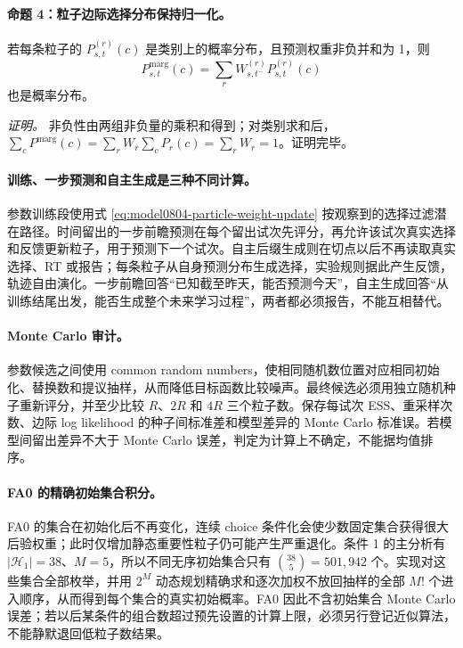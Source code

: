 \paragraph{命题 4：粒子边际选择分布保持归一化。}
若每条粒子的 $P^{(r)}_{s,t}(c)$ 是类别上的概率分布，且预测权重非负并和为 1，则
\begin{equation}
    P^{\mathrm{marg}}_{s,t}(c)
    =\sum_rW^{(r)}_{s,t^-}P^{(r)}_{s,t}(c)
    \label{eq:model0804-marginal-distribution}
\end{equation}
也是概率分布。

\textit{证明。}
非负性由两组非负量的乘积和得到；对类别求和后，$\sum_cP^{\mathrm{marg}}(c)=\sum_rW_r\sum_cP_r(c)=\sum_rW_r=1$。证明完毕。

\paragraph{训练、一步预测和自主生成是三种不同计算。}
参数训练段使用式 \ref{eq:model0804-particle-weight-update} 按观察到的选择过滤潜在路径。时间留出的一步前瞻预测在每个留出试次先评分，再允许该试次真实选择和反馈更新粒子，用于预测下一个试次。自主后缀生成则在切点以后不再读取真实选择、RT 或报告；每条粒子从自身预测分布生成选择，实验规则据此产生反馈，轨迹自由演化。一步前瞻回答“已知截至昨天，能否预测今天”，自主生成回答“从训练结尾出发，能否生成整个未来学习过程”，两者都必须报告，不能互相替代。

\paragraph{Monte Carlo 审计。}
参数候选之间使用 common random numbers，使相同随机数位置对应相同初始化、替换数和提议抽样，从而降低目标函数比较噪声。最终候选必须用独立随机种子重新评分，并至少比较 $R$、$2R$ 和 $4R$ 三个粒子数。保存每试次 ESS、重采样次数、边际 log likelihood 的种子间标准差和模型差异的 Monte Carlo 标准误。若模型间留出差异不大于 Monte Carlo 误差，判定为计算上不确定，不能据均值排序。

\paragraph{FA0 的精确初始集合积分。}
FA0 的集合在初始化后不再变化，连续 choice 条件化会使少数固定集合获得很大后验权重；此时仅增加静态重要性粒子仍可能产生严重退化。条件 1 的主分析有 $|\mathcal H_1|=38$、$M=5$，所以不同无序初始集合只有 $\binom{38}{5}=501{,}942$ 个。实现对这些集合全部枚举，并用 $2^M$ 动态规划精确求和逐次加权不放回抽样的全部 $M!$ 个进入顺序，从而得到每个集合的真实初始概率。FA0 因此不含初始集合 Monte Carlo 误差；若以后某条件的组合数超过预先设置的计算上限，必须另行登记近似算法，不能静默退回低粒子数结果。

